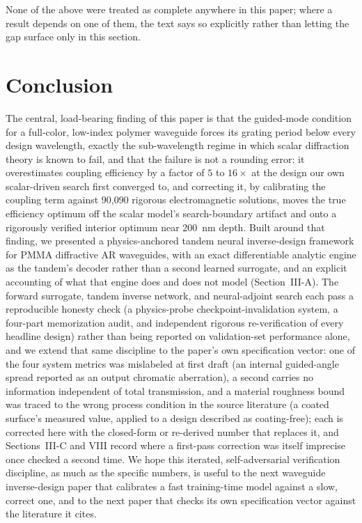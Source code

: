 \documentclass[10pt,twocolumn]{article}
\begin{document}
None of the above were treated as complete anywhere in this paper; where a
result depends on one of them, the text says so explicitly rather than
letting the gap surface only in this section.

\section{Conclusion}

The central, load-bearing finding of this paper is that the guided-mode
condition for a full-color, low-index polymer waveguide forces its grating
period below every design wavelength, exactly the sub-wavelength regime in
which scalar diffraction theory is known to fail, and that the failure is
not a rounding error: it overestimates coupling efficiency by a factor of
$5$ to $16\times$ at the design our own scalar-driven search first
converged to, and correcting it, by calibrating the coupling term against
90,090 rigorous electromagnetic solutions, moves the true efficiency
optimum off the scalar model's search-boundary artifact and onto a
rigorously verified interior optimum near 200~nm depth. Built around that
finding, we presented a physics-anchored tandem neural inverse-design
framework for PMMA diffractive AR waveguides, with an exact differentiable
analytic engine as the tandem's decoder rather than a second learned
surrogate, and an explicit accounting of what that engine does and does not
model (Section~III-A). The forward surrogate, tandem inverse network, and
neural-adjoint search each pass a reproducible honesty check (a
physics-probe checkpoint-invalidation system, a four-part memorization
audit, and independent rigorous re-verification of every headline design)
rather than being reported on validation-set performance alone, and we
extend that same discipline to the paper's own specification vector: one
of the four system metrics was mislabeled at first draft (an internal
guided-angle spread reported as an output chromatic aberration), a second
carries no information independent of total transmission, and a material
roughness bound was traced to the wrong process condition in the source
literature (a coated surface's measured value, applied to a design
described as coating-free); each is corrected here with the closed-form
or re-derived number that replaces it, and Sections~III-C and VIII record
where a first-pass correction was itself imprecise once checked a second
time. We hope this iterated, self-adversarial verification discipline, as
much as the specific numbers, is useful to the next waveguide
inverse-design paper that calibrates a fast training-time model against a
slow, correct one, and to the next paper that checks its own specification
vector against the literature it cites.
\end{document}
